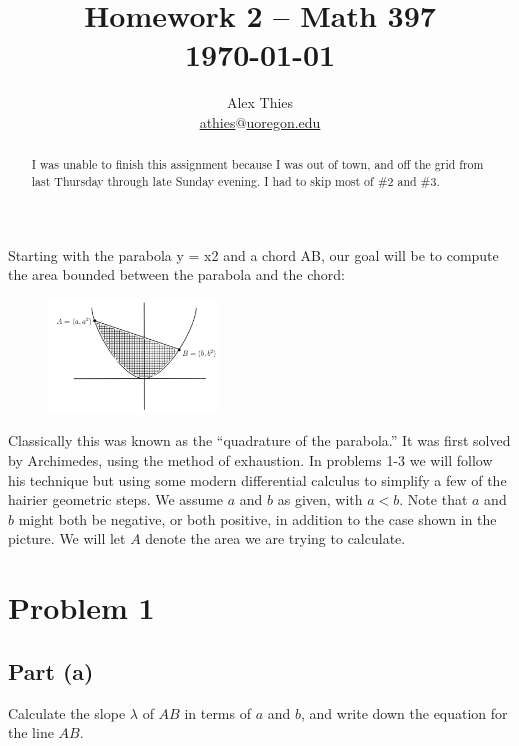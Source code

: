 \documentclass[letterpaper, 12pt]{amsart}
\theoremstyle{definition}  %
\begin{document}
	\title{Homework 2  -- Math 397 \\ \today}
	\author{Alex Thies \\ \href{mailto:athies@uoregon.edu}{\lowercase{athies$@$uoregon.edu}}}

	\begin{abstract}
		I was unable to finish this assignment because I was out of town, and off the grid from last Thursday through late Sunday evening.
		I had to skip most of \#2 and \#3.
	\end{abstract}

	\maketitle

	Starting with the parabola y = x2 and a chord AB, our goal will be to compute the area bounded between the parabola and the chord:
	\begin{figure}[h]
		\includegraphics[width=0.4\textwidth]{figures/0.png}
	\end{figure}

	Classically this was known as the ``quadrature of the parabola.'' 
	It was first solved by Archimedes, using the method of exhaustion. 
	In problems 1-3 we will follow his technique but using some modern differential calculus to simplify a few of the hairier geometric steps. 
	We assume $a$ and $b$ as given, with $a < b$. 
	Note that $a$ and $b$ might both be negative, or both positive, in addition to the case shown in the picture. 
	We will let $A$ denote the area we are trying to calculate.

	\section*{Problem 1}
		\subsection*{Part (a)}
		Calculate the slope $\lambda$ of $AB$ in terms of $a$ and $b$, and write down the equation for the line $AB$.
\end{document}
